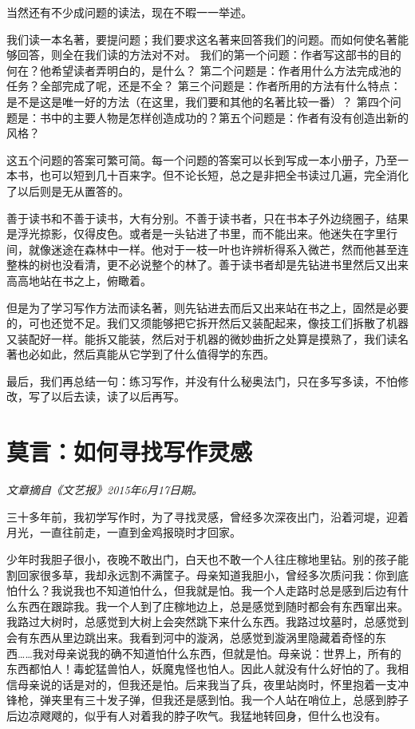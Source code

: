 \documentclass[fontset=fandol,12pt,a5paper]{ctexbook}
\begin{document}
当然还有不少成问题的读法，现在不暇一一举述。

我们读一本名著，要提问题；我们要求这名著来回答我们的问题。而如何使名著能够回答，则全在我们读的方法对不对。
我们的第一个问题：作者写这部书的目的何在？他希望读者弄明白的，是什么？
第二个问题是：作者用什么方法完成池的任务？全部完成了呢，还是不全？
第三个问题是：作者所用的方法有什么特点：是不是这是唯一好的方法（在这里，我们要和其他的名著比较一番）？
第四个问题是：书中的主要人物是怎样创造成功的？第五个问题是：作者有没有创造出新的风格？

这五个问题的答案可繁可简。每一个问题的答案可以长到写成一本小册子，乃至一本书，也可以短到几十百来字。但不论长短，总之是非把全书读过几遍，完全消化了以后则是无从置答的。

善于读书和不善于读书，大有分别。不善于读书者，只在书本子外边绕圈子，结果是浮光掠影，仅得皮色。或者是一头钻进了书里，而不能出来。他迷失在字里行间，就像迷途在森林中一样。他对于一枝一叶也许辨析得系入微芒，然而他甚至连整株的树也没看清，更不必说整个的林了。善于读书者却是先钻进书里然后又出来高高地站在书之上，俯瞰着。

但是为了学习写作方法而读名著，则先钻进去而后又出来站在书之上，固然是必要的，可也还觉不足。我们又须能够把它拆开然后又装配起来，像技工们拆散了机器又装配好一样。能拆又能装，然后对于机器的微妙曲折之处算是摸熟了，我们读名著也必如此，然后真能从它学到了什么值得学的东西。

最后，我们再总结一句：练习写作，并没有什么秘奥法门，只在多写多读，不怕修改，写了以后去读，读了以后再写。

\newpage

\section{莫言：如何寻找写作灵感}

\emph{文章摘自《文艺报》2015年6月17日期。}
\vspace{2em}

三十多年前，我初学写作时，为了寻找灵感，曾经多次深夜出门，沿着河堤，迎着月光，一直往前走，一直到金鸡报晓时才回家。

少年时我胆子很小，夜晚不敢出门，白天也不敢一个人往庄稼地里钻。别的孩子能割回家很多草，我却永远割不满筐子。母亲知道我胆小，曾经多次质问我：你到底怕什么？我说我也不知道怕什么，但我就是怕。我一个人走路时总是感到后边有什么东西在跟踪我。我一个人到了庄稼地边上，总是感觉到随时都会有东西窜出来。我路过大树时，总感觉到大树上会突然跳下来什么东西。我路过坟墓时，总感觉到会有东西从里边跳出来。我看到河中的漩涡，总感觉到漩涡里隐藏着奇怪的东西……我对母亲说我的确不知道怕什么东西，但就是怕。母亲说：世界上，所有的东西都怕人！毒蛇猛兽怕人，妖魔鬼怪也怕人。因此人就没有什么好怕的了。我相信母亲说的话是对的，但我还是怕。后来我当了兵，夜里站岗时，怀里抱着一支冲锋枪，弹夹里有三十发子弹，但我还是感到怕。我一个人站在哨位上，总感到脖子后边凉飕飕的，似乎有人对着我的脖子吹气。我猛地转回身，但什么也没有。
\end{document}
